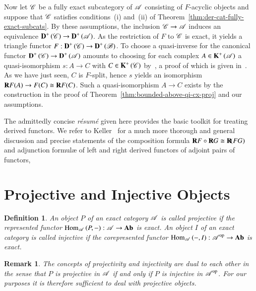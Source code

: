 \documentclass[1p]{elsarticle}
\theoremstyle{mythm}
\theoremstyle{mydef}
\newtheorem{Rem}[Thm]{Remark}
\newtheorem{Def}[Thm]{Definition}
\begin{document}
Now let $\operatorname{\mathscr{C}}$ be a fully exact subcategory of $\operatorname{\mathscr{A}}$ consisting of
$F$-acyclic objects and suppose that $\operatorname{\mathscr{C}}$ satisfies conditions~(i)
and~(ii) of Theorem~\ref{thm:der-cat-fully-exact-subcats}. 
By these assumptions, the inclusion $\operatorname{\mathscr{C}} \to \operatorname{\mathscr{A}}$ induces an
equivalence $\operatorname{\mathbf{D}}^{+}{(\operatorname{\mathscr{C}})} \to \operatorname{\mathbf{D}}^{+}{(\operatorname{\mathscr{A}})}$. As the
restriction of $F$ to $\operatorname{\mathscr{C}}$ is exact, it yields a triangle 
functor $F: \operatorname{\mathbf{D}}^{+}{(\operatorname{\mathscr{C}})} \to  \operatorname{\mathbf{D}}^{+}{(\operatorname{\mathscr{B}})}$. To choose a
quasi-inverse for the canonical functor $\operatorname{\mathbf{D}}^{+}{(\operatorname{\mathscr{C}})} \to
\operatorname{\mathbf{D}}^{+}{(\operatorname{\mathscr{A}})}$ amounts to choosing for each complex $A \in
\operatorname{\mathbf{K}}^{+}{(\operatorname{\mathscr{A}})}$ a quasi-isomorphism $s:A \to C$ with $C \in
\operatorname{\mathbf{K}}^{+}{(\operatorname{\mathscr{C}})}$ by~\cite[1.6]{MR907948}, a proof of which is given
in~\cite[6.7]{MR1102982}. As we have just seen, $C$ is $F$-split, hence $s$
yields an isomorphism $\operatorname{\mathbf{R}}\!F(A) \to F(C) \cong \operatorname{\mathbf{R}}\!F(C)$. Such a
quasi-isomorphism $A \to C$ exists by the construction in the proof of
Theorem~\ref{thm:bounded-above-qi-cx-proj} and our assumptions.

The admittedly concise \emph{r\'{e}sum\'{e}} given here provides the
basic toolkit for treating derived functors. We refer to
Keller~\cite[\S\S{}13--15]{MR1421815} for a much more thorough and
general discussion and precise statements of the composition formula
$\operatorname{\mathbf{R}}\!F \circ \operatorname{\mathbf{R}}\!G \cong \operatorname{\mathbf{R}}\!(FG)$ and adjunction formul\ae{} of
left and right derived functors of adjoint pairs of functors,

\section{Projective and Injective Objects}
\label{sec:proj-inj-obj}

\begin{Def}
  \label{def:projective-injective}
  An object $P$ of an exact category $\operatorname{\mathscr{A}}$ is called
  \emph{projective} if the represented functor
  $\operatorname{Hom}_{\operatorname{\mathscr{A}}}{(P,{-})}: \operatorname{\mathscr{A}} \to \operatorname{\mathbf{Ab}}$ is exact. An object
  $I$ of an exact category is called \emph{injective} if the
  corepresented functor $\operatorname{Hom}_{\operatorname{\mathscr{A}}}{({-},I)}: \operatorname{\mathscr{A}}^{\operatorname{op}} \to \operatorname{\mathbf{Ab}}$
  is exact.
\end{Def}

\begin{Rem}
  The concepts of projectivity and injectivity are dual to each other
  in the sense that $P$ is projective in $\operatorname{\mathscr{A}}$ if and only if $P$ is
  injective in $\operatorname{\mathscr{A}}^{\operatorname{op}}$. For our purposes it is therefore
  sufficient to deal with projective objects. 
\end{Rem}
\end{document}
